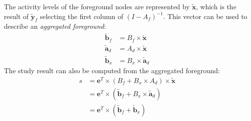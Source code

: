 The activity levels of the foreground nodes are represented by $\tilde{\mathbf{x}}$, which is the result of $\tilde{\mathbf{y}}_f$ selecting the first column of $(I-A_f)^{-1}$.
This vector can be used to describe an \emph{aggregated foreground}:
\begin{equation}
\begin{array}{rl}
    \tilde{\mathbf{b}}_f & = B_f \times \tilde{\mathbf{x}} \\
    \tilde{\mathbf{a}}_d & = A_d \times \tilde{\mathbf{x}} \\
    \tilde{\mathbf{b}}_x & = B_x \times \tilde{\mathbf{a}}_d
\end{array}
\label{eqn:agg}
\end{equation}
The study result can also be computed from the aggregated foreground:
\begin{equation}
\begin{array}{rl}
s & = \mathbf{e}^T \times( B_f + B_x \times A_d) \times \tilde{\mathbf{x}} \\
  & = \mathbf{e}^T \times( \tilde{\mathbf{b}}_f + B_x \times\tilde{\mathbf{a}}_d) \\
  & = \mathbf{e}^T \times( \tilde{\mathbf{b}}_f + \tilde{\mathbf{b}}_x) \\
\end{array}
\end{equation}
